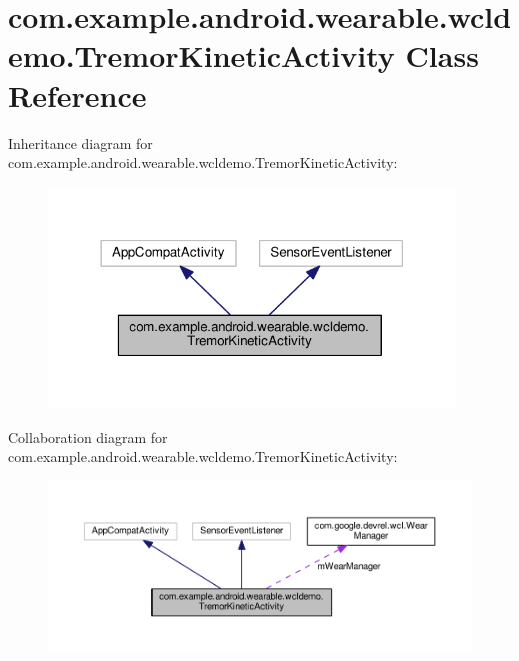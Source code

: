 \hypertarget{classcom_1_1example_1_1android_1_1wearable_1_1wcldemo_1_1TremorKineticActivity}{}\section{com.\+example.\+android.\+wearable.\+wcldemo.\+Tremor\+Kinetic\+Activity Class Reference}
\label{classcom_1_1example_1_1android_1_1wearable_1_1wcldemo_1_1TremorKineticActivity}


Inheritance diagram for com.\+example.\+android.\+wearable.\+wcldemo.\+Tremor\+Kinetic\+Activity\+:\nopagebreak
\begin{figure}[H]
\begin{center}
\leavevmode
\includegraphics[width=306pt]{de/da5/classcom_1_1example_1_1android_1_1wearable_1_1wcldemo_1_1TremorKineticActivity__inherit__graph}
\end{center}
\end{figure}


Collaboration diagram for com.\+example.\+android.\+wearable.\+wcldemo.\+Tremor\+Kinetic\+Activity\+:\nopagebreak
\begin{figure}[H]
\begin{center}
\leavevmode
\includegraphics[width=350pt]{de/d41/classcom_1_1example_1_1android_1_1wearable_1_1wcldemo_1_1TremorKineticActivity__coll__graph}
\end{center}
\end{figure}
